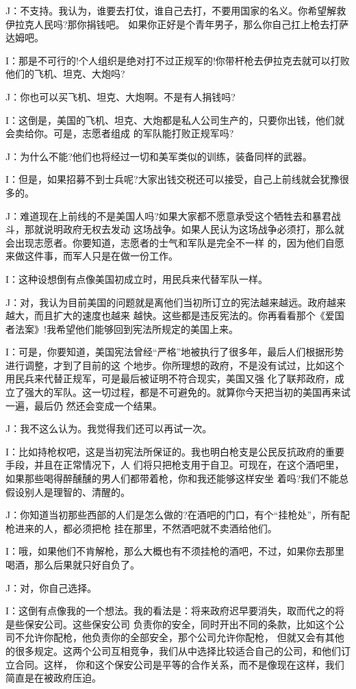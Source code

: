 ﻿\documentclass[11pt]{article}
\begin{document}
J：不支持。我认为，谁要去打仗，谁自己去打，不要用国家的名义。你希望解救伊拉克人民吗?那你捐钱吧。
如果你正好是个青年男子，那么你自己扛上枪去打萨达姆吧。

I：那是不可行的!个人组织是绝对打不过正规军的!你带杆枪去伊拉克去就可以打败他们的飞机、坦克、大炮吗?

J：你也可以买飞机、坦克、大炮啊。不是有人捐钱吗?

I：这倒是，美国的飞机、坦克、大炮都是私人公司生产的，只要你出钱，他们就会卖给你。可是，志愿者组成
的军队能打败正规军吗?

J：为什么不能?他们也将经过一切和美军类似的训练，装备同样的武器。

I：但是，如果招募不到士兵呢?大家出钱交税还可以接受，自己上前线就会犹豫很多的。

J：难道现在上前线的不是美国人吗?如果大家都不愿意承受这个牺牲去和暴君战斗，那就说明政府无权去发动
这场战争。如果人民认为这场战争必须打，那么就会出现志愿者。你要知道，志愿者的士气和军队是完全不一样
的，因为他们自愿来做这件事，而军人只是在做一份工作。

I：这种设想倒有点像美国初成立时，用民兵来代替军队一样。

J：对，我认为目前美国的问题就是离他们当初所订立的宪法越来越远。政府越来越大，而且扩大的速度也越来
越快。这些都是违反宪法的。你再看看那个《爱国者法案》!我希望他们能够回到宪法所规定的美国上来。

I：可是，你要知道，美国宪法曾经``严格''地被执行了很多年，最后人们根据形势进行调整，才到了目前的这
个地步。你所理想的政府，不是没有试过，比如这个用民兵来代替正规军，可是最后被证明不符合现实，美国又强
化了联邦政府，成立了强大的军队。这一切过程，都是不可避免的。就算你今天把当初的美国再来试一遍，最后仍
然还会变成一个结果。

J：我不这么认为。我觉得我们还可以再试一次。

I：比如持枪权吧，这是当初宪法所保证的。我也明白枪支是公民反抗政府的重要手段，并且在正常情况下，人
们将只把枪支用于自卫。可现在，在这个酒吧里，如果那些喝得醉醺醺的男人们都带着枪，你和我还能够这样安坐
着吗?我们不能总假设别人是理智的、清醒的。

J：你知道当初那些西部的人们是怎么做的?在酒吧的门口，有个``挂枪处''，所有配枪进来的人，都必须把枪
挂在那里，不然酒吧就不卖酒给他们。

I：哦，如果他们不肯解枪，那么大概也有不须挂枪的酒吧，不过，如果你去那里喝酒，那么后果就只好自负了。

J：对，你自己选择。

I：这倒有点像我的一个想法。我的看法是：将来政府迟早要消失，取而代之的将是些保安公司。这些保安公司
负责你的安全，同时开出不同的条款，比如这个公司不允许你配枪，他负责你的全部安全，那个公司允许你配枪，
但就又会有其他的很多规定。这两个公司互相竞争，我们从中选择比较适合自己的公司，和他们订立合同。这样，
你和这个保安公司是平等的合作关系，而不是像现在这样，我们简直是在被政府压迫。
\end{document}
